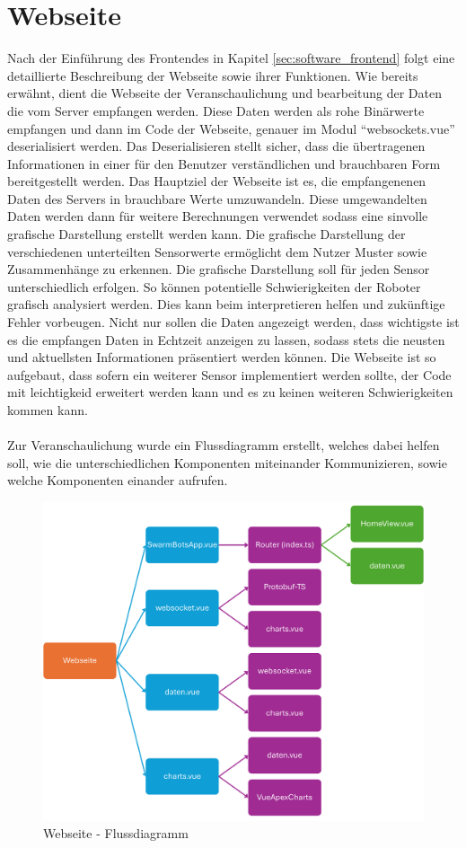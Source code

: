 \section{Webseite}
\label{subsec:frontend_Webseite}
Nach der Einführung des Frontendes in Kapitel \ref{sec:software_frontend} folgt eine detaillierte
Beschreibung der Webseite sowie ihrer Funktionen. 
%
Wie bereits erwähnt, dient die Webseite der Veranschaulichung 
und bearbeitung der Daten die vom Server empfangen werden. 
%
Diese Daten werden als rohe Binärwerte empfangen und dann im Code der Webseite,
genauer im Modul ``websockets.vue'' deserialisiert werden. 
Das Deserialisieren stellt sicher, dass die übertragenen Informationen in einer für den Benutzer 
verständlichen und brauchbaren Form bereitgestellt werden. 
%
Das Hauptziel der Webseite ist es, die empfangenenen Daten des Servers in brauchbare Werte umzuwandeln. 
Diese umgewandelten Daten werden dann für weitere Berechnungen verwendet sodass eine sinvolle grafische Darstellung
erstellt werden kann.
%
Die grafische Darstellung der verschiedenen unterteilten Sensorwerte ermöglicht dem Nutzer Muster sowie 
Zusammenhänge zu erkennen. 
%
Die grafische Darstellung soll für jeden Sensor unterschiedlich erfolgen. So können potentielle Schwierigkeiten 
der Roboter grafisch analysiert werden. Dies kann beim interpretieren helfen und zukünftige Fehler vorbeugen. 
%
Nicht nur sollen die Daten angezeigt werden, dass wichtigste ist es die empfangen Daten 
in Echtzeit anzeigen zu lassen, sodass stets die neusten und aktuellsten Informationen präsentiert werden können.
%
Die Webseite ist so aufgebaut, dass sofern ein weiterer Sensor implementiert werden sollte, 
der Code mit leichtigkeid erweitert werden kann und es zu keinen weiteren Schwierigkeiten kommen kann.  
\\ \\
Zur Veranschaulichung wurde ein Flussdiagramm erstellt, 
welches dabei helfen soll, 
wie die unterschiedlichen Komponenten miteinander Kommunizieren,
sowie welche Komponenten einander aufrufen.
%
\begin{figure}[H]
  \includegraphics[width=\textwidth, center]{img/Webseite_FD.png}
  \caption{Webseite - Flussdiagramm}
  \label{fig:Webseite_Flowchart}
\end{figure}

